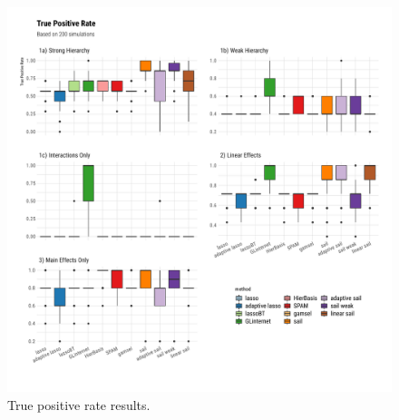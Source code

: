 \begin{knitrout}\scriptsize
	\color{fgcolor}\begin{figure}[H]
		
		{\centering \includegraphics[width=1\linewidth]{figs/plot-tpr-sim-1} 
			
		}
		
		\caption[True positive rate results]{True positive rate results.}\label{fig:plot-tpr-sim}
	\end{figure}
	
	
\end{knitrout}

